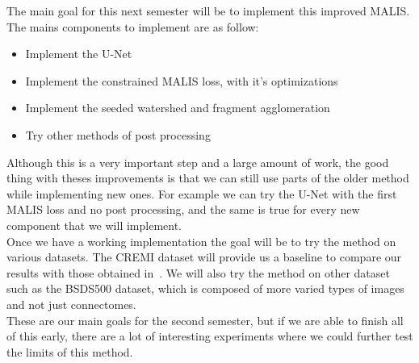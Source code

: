 The main goal for this next semester will be to implement this improved MALIS.
The mains components to implement are as follow:
\begin{itemize}
	\item Implement the U-Net
	\item Implement the constrained MALIS loss, with it's optimizations
	\item Implement the seeded watershed and fragment agglomeration
	\item Try other methods of post processing
\end{itemize}

Although this is a very important step and a large amount of work, the good
thing with theses improvements is that we can still use parts of the older
method while implementing new ones. For example we can try the U-Net with the
first MALIS loss and no post processing, and the same is true for every new
component that we will implement.\\

Once we have a working implementation the goal will be to try the method on
various datasets. The CREMI dataset will provide us a baseline to compare our
results with those obtained in~\cite{funke_large_2019}. We will also try the
method on other dataset such as the BSDS500 dataset, which is composed of more
varied types of images and not just connectomes.\\

These are our main goals for the second semester, but if we are able to finish
all of this early, there are a lot of interesting experiments where we could
further test the limits of this method.
